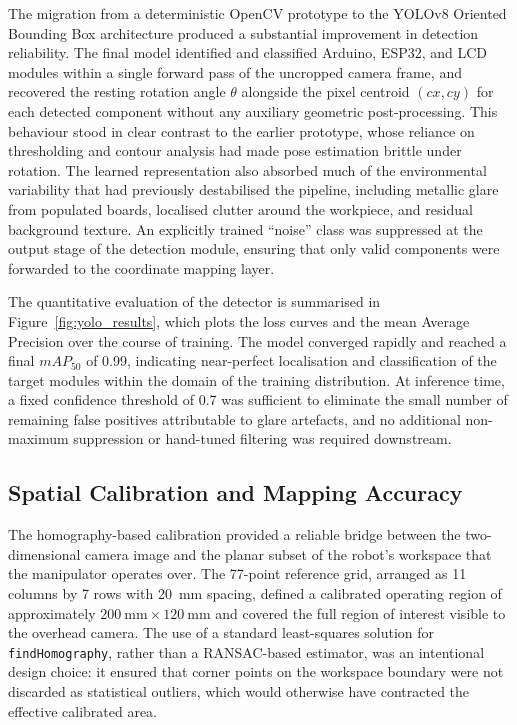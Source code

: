 \documentclass[conference]{IEEEtran}
\begin{document}
The migration from a deterministic OpenCV prototype to the YOLOv8 Oriented Bounding Box architecture produced a substantial improvement in detection reliability. The final model identified and classified Arduino, ESP32, and LCD modules within a single forward pass of the uncropped camera frame, and recovered the resting rotation angle $\theta$ alongside the pixel centroid $(cx, cy)$ for each detected component without any auxiliary geometric post-processing. This behaviour stood in clear contrast to the earlier prototype, whose reliance on thresholding and contour analysis had made pose estimation brittle under rotation. The learned representation also absorbed much of the environmental variability that had previously destabilised the pipeline, including metallic glare from populated boards, localised clutter around the workpiece, and residual background texture. An explicitly trained ``noise'' class was suppressed at the output stage of the detection module, ensuring that only valid components were forwarded to the coordinate mapping layer.

The quantitative evaluation of the detector is summarised in Figure~\ref{fig:yolo_results}, which plots the loss curves and the mean Average Precision over the course of training. The model converged rapidly and reached a final $mAP_{50}$ of 0.99, indicating near-perfect localisation and classification of the target modules within the domain of the training distribution. At inference time, a fixed confidence threshold of 0.7 was sufficient to eliminate the small number of remaining false positives attributable to glare artefacts, and no additional non-maximum suppression or hand-tuned filtering was required downstream.

\subsection{Spatial Calibration and Mapping Accuracy}
The homography-based calibration provided a reliable bridge between the two-dimensional camera image and the planar subset of the robot's workspace that the manipulator operates over. The 77-point reference grid, arranged as 11 columns by 7 rows with 20~mm spacing, defined a calibrated operating region of approximately $200~\text{mm} \times 120~\text{mm}$ and covered the full region of interest visible to the overhead camera. The use of a standard least-squares solution for \texttt{findHomography}, rather than a RANSAC-based estimator, was an intentional design choice: it ensured that corner points on the workspace boundary were not discarded as statistical outliers, which would otherwise have contracted the effective calibrated area.
\end{document}
